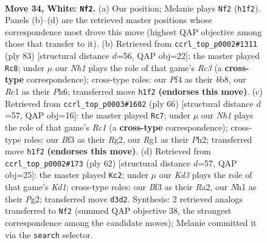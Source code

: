 \documentclass[11pt]{article}
\begin{document}
\clearpage

\begin{figure}[p]\centering
\begin{subfigure}{0.46\textwidth}\centering
\resizebox{\linewidth}{!}{%
\newchessgame
\chessboard[
  setfen={3r1kr1/1p3p1p/4b1p1/p2p4/5P2/3K1BP1/PP5P/2R3RN w - - 1 34},
  showmover=false,
  pgfstyle=straightmove, color=movearrow, markmove={h1-f2}
]}
\caption{}
\end{subfigure}\hfill
\begin{subfigure}{0.46\textwidth}\centering
\resizebox{\linewidth}{!}{%
\newchessgame
\chessboard[
  setfen={1B6/3k2p1/1pr2p1p/p2b3P/3P4/P2R1PK1/1P4P1/8 b - - 15 42},
  showmover=false,
  pgfstyle=straightmove, color=movearrow, markmove={c6-c8}
]}
\caption{}
\end{subfigure}
\\[4pt]
\begin{subfigure}{0.46\textwidth}\centering
\resizebox{\linewidth}{!}{%
\newchessgame
\chessboard[
  setfen={4r3/1p1r1k2/p2Ppb2/4p1p1/8/P3BP2/1P4RP/1KR5 w - - 6 34},
  showmover=false,
  pgfstyle=straightmove, color=movearrow, markmove={c1-c7}
]}
\caption{}
\end{subfigure}\hfill
\begin{subfigure}{0.46\textwidth}\centering
\resizebox{\linewidth}{!}{%
\newchessgame
\chessboard[
  setfen={1r3k2/1r4pp/5p2/p3p3/1bP1N3/1P1R1P2/R5PP/3K4 w - - 2 32},
  showmover=false,
  pgfstyle=straightmove, color=movearrow, markmove={d1-c2}
]}
\caption{}
\end{subfigure}
\caption{\textbf{Move 34, White: \texttt{Nf2}.} (a) Our position; Melanie plays \texttt{Nf2} (\texttt{h1f2}). Panels (b)--(d) are the retrieved master positions whose correspondence most drove this move (highest QAP objective among those that transfer to it). (b) Retrieved from \texttt{ccrl\_top\_p0002\#1311} (ply 83) [structural distance $d$=56, QAP obj=22]: the master played \texttt{Rc8}; under $\mu$ our \emph{Nh1} plays the role of that game's \emph{Rc3} (a \textbf{cross-type} correspondence); cross-type roles: our \emph{P}f4 as their \emph{b}b8, our \emph{R}c1 as their \emph{P}h6; transferred move \texttt{h1f2} \textbf{(endorses this move)}. (c) Retrieved from \texttt{ccrl\_top\_p0003\#1602} (ply 66) [structural distance $d$=57, QAP obj=16]: the master played \texttt{Rc7}; under $\mu$ our \emph{Nh1} plays the role of that game's \emph{Rc1} (a \textbf{cross-type} correspondence); cross-type roles: our \emph{B}f3 as their \emph{R}g2, our \emph{R}g1 as their \emph{P}h2; transferred move \texttt{h1f2} \textbf{(endorses this move)}. (d) Retrieved from \texttt{ccrl\_top\_p0002\#173} (ply 62) [structural distance $d$=57, QAP obj=25]: the master played \texttt{Kc2}; under $\mu$ our \emph{Kd3} plays the role of that game's \emph{Kd1}; cross-type roles: our \emph{B}f3 as their \emph{R}a2, our \emph{N}h1 as their \emph{P}g2; transferred move \texttt{d3d2}. Synthesis: 2 retrieved analogs transferred to \texttt{Nf2} (summed QAP objective 38, the strongest correspondence among the candidate moves); Melanie committed it via the \texttt{search} selector.}
\label{fig:thought-m66}
\end{figure}
\end{document}
